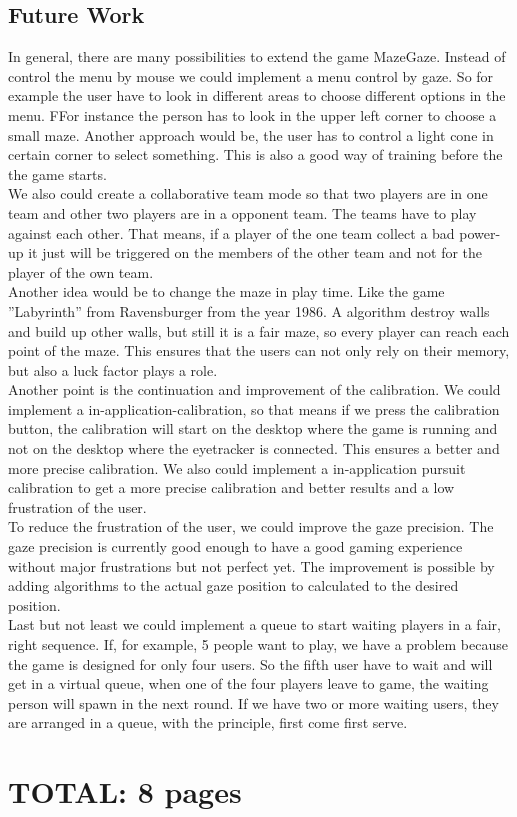 \documentclass{sigchi}
\begin{document}
\subsection{Future Work}
In general, there are many possibilities to extend the game MazeGaze. Instead of control the menu by mouse we could implement a menu control by gaze. So for example the user have to look in different areas to choose different options in the menu. FFor instance the person has to look in the upper left corner to choose a small maze. Another approach would be, the user has to control a light cone in certain corner to select something. This is also a good way of training before the the game starts.\\ 
We also could create a collaborative team mode so that two players are in one team and other two players are in a opponent team. The teams have to play against each other. That means, if a player of the one team collect a bad power-up it just will be triggered on the members of the other team and not for the player of the own team.\\ 
Another idea would be to change the maze in play time. Like the game ''Labyrinth'' from Ravensburger from the year 1986. A algorithm destroy walls and build up other walls, but still it is a fair maze, so every player can reach each point of the maze. This ensures that the users can not only rely on their memory, but also a luck factor plays a role.\\
Another point is the continuation and improvement of the calibration. We could implement a in-application-calibration, so that means if we press the calibration button, the calibration will start on the desktop where the game is running and not on the desktop where the eyetracker is connected. This ensures a better and more precise calibration. We also could implement a  in-application pursuit calibration to get a more precise calibration and better results and a low frustration of the user.\\ 
To reduce the frustration of the user, we could improve the gaze precision. The gaze precision is currently good enough to have a good gaming experience without major frustrations but not perfect yet. The improvement is possible by adding algorithms to the actual gaze position to calculated to the desired position. \\
Last but not least we could implement a queue to start waiting players in a fair, right sequence. If, for example, 5 people want to play, we have a problem because the game is designed for only four users. So the fifth user have to wait and will get in a virtual queue, when one of the four players leave to game, the waiting person will spawn in the next round. If we have two or more waiting users, they are arranged in a queue, with the principle, first come first serve.

\section{TOTAL: 8 pages}

\balance{}




\end{document}

